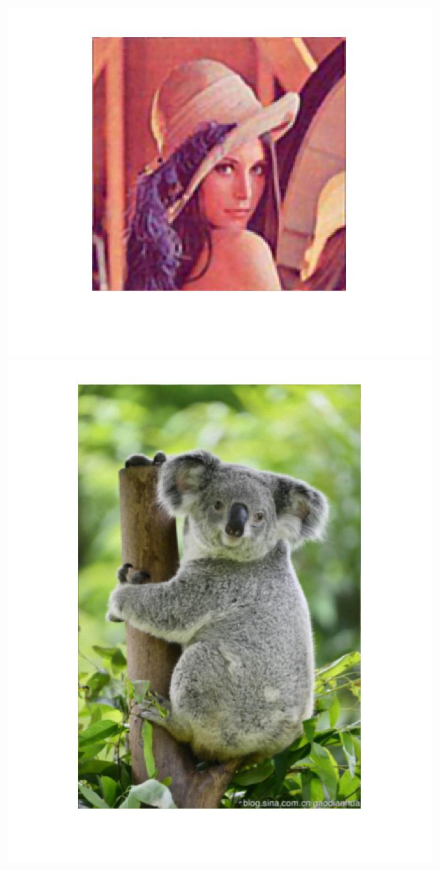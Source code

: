 \documentclass{article}
\theoremstyle{plain} \newtheorem{thm}{Theorem}
\begin{document}
\begin{figure}
\begin{minipage}{.5\linewidth}
		\includegraphics[width=\linewidth]{classic_recovered_cyclic.jpg}
	\end{minipage}
	\begin{minipage}{.5\linewidth}
		\includegraphics[width=\textwidth]{koala_blurred_cyclic.jpg}

\end{minipage}
\end{figure}
\end{document}
